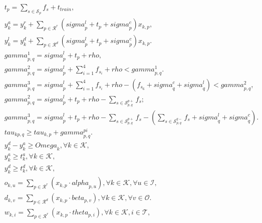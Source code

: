 \begin{align}
  & t_{p} = \sum_{s \in \mathcal{S}_{p}} f_{s} + t_{t r a i n} , \tag{eq\_0001} \\
  & y_{k}^{a} = y_{k}^{r} + \sum_{p \in \mathcal{R}^{r}} \left(\mathit{sigma}_{p}^{l} + t_{p} + \mathit{sigma}_{p}^{c}\right) x_{k , p} , \tag{eq\_0002} \\
  & y_{k}^{l} = y_{k}^{d} + \sum_{p \in \mathcal{R}^{d}} \left(\mathit{sigma}_{p}^{l} + t_{p} + \mathit{sigma}_{p}^{c}\right) x_{k , p} . \tag{eq\_0003} \\
  & \mathit{gamma}_{p , q}^{1} = \mathit{sigma}_{p}^{l} + t_{p} + \mathit{rho} , \tag{eq\_0005} \\
  & \mathit{gamma}_{p , q}^{2} = \mathit{sigma}_{p}^{l} + \sum_{i = 1}^{4} f_{s_{i}} + \mathit{rho} < \mathit{gamma}_{p , q}^{1} . \tag{eq\_0006} \\
  & \mathit{gamma}_{p , q}^{3} = \mathit{sigma}_{p}^{l} + \sum_{i = 1}^{4} f_{s_{i}} + \mathit{rho} - \left(f_{s_{6}} + \mathit{sigma}_{q}^{c} + \mathit{sigma}_{q}^{l}\right) < \mathit{gamma}_{p , q}^{2} , \tag{eq\_0007} \\
  & \mathit{gamma}_{p , q}^{2} = \mathit{sigma}_{p}^{l} + t_{p} + \mathit{rho} - \sum_{s \in \mathcal{S}_{p , q}^{p +}} f_{s} ; \tag{eq\_0010} \\
  & \mathit{gamma}_{p , q}^{3} = \mathit{sigma}_{p}^{l} + t_{p} + \mathit{rho} - \sum_{s \in \mathcal{S}_{p , q}^{p +}} f_{s} - \left(\sum_{s \in \mathcal{S}_{p , q}^{q -}} f_{s} + \mathit{sigma}_{q}^{l} + \mathit{sigma}_{q}^{c}\right) . \tag{eq\_0011} \\
  & \mathit{tau}_{kp , q} \geq \mathit{tau}_{k , p} + \mathit{gamma}_{p , q}^{\mathit{pi}} . \tag{eq\_0012} \\
  & y_{k}^{d} - y_{k}^{a} \geq \mathit{Omega}_{k} , \forall k \in \mathcal{K} , \tag{eq\_0013} \\
  & y_{k}^{a} \geq t_{k}^{a} , \forall k \in \mathcal{K} , \tag{eq\_0014} \\
  & y_{k}^{d} \geq t_{k}^{d} , \forall k \in \mathcal{K} , \tag{eq\_0016} \\
  & o_{k , u} = \sum_{p \in \mathcal{R}^{r}} \left(x_{k , p} \cdot \mathit{alpha}_{p , u}\right) , \forall k \in \mathcal{K} , \forall u \in \mathcal{I} , \tag{eq\_0017} \\
  & d_{k , v} = \sum_{p \in \mathcal{R}^{d}} \left(x_{k , p} \cdot \mathit{beta}_{p , v}\right) , \forall k \in \mathcal{K} , \forall v \in \mathcal{O} . \tag{eq\_0019} \\
  & w_{k , i} = \sum_{p \in \mathcal{R}^{r}} \left(x_{k , p} \cdot \mathit{theta}_{p , i}\right) , \forall k \in \mathcal{K} , i \in \mathcal{T} , \tag{eq\_0020} \\

\end{align}
